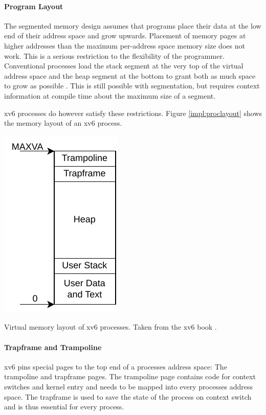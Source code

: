 \paragraph{Program Layout} The segmented memory design assumes that programs place their data at the low end of their address
space and grow upwards.
Placement of memory pages at higher addresses than the maximum per-address space memory size does not work. This is a serious restriction to the flexibility of the programmer. Conventional processes load the stack segment at the very top of the virtual address space and the heap segment at the bottom to grant both as much space to grow as possible \cite{tanenbaumOS}. This is still possible with segmentation, but requires context information at compile time about the maximum size of a segment.

xv6 processes do however satisfy these restrictions. Figure \ref{impl:proclayout} shows the memory layout
of an xv6 process.

\begin{marginfigure}
    \centering
    \includegraphics[scale=.8]{figures/prog_vm.pdf}
    \caption[xv6 memory layout]{Virtual memory layout of xv6 processes. Taken from the xv6 book \cite{cox2011xv6}.}
    \label{impl:proclayout}
\end{marginfigure}


\paragraph{Trapframe and Trampoline} xv6 pins special pages to the top end of a processes address space: The trampoline and trapframe pages.
The trampoline page contains code for context switches and kernel entry and needs to be mapped
into every processes address space.
The trapframe is used to save the state of the process on context switch and is thus essential for every process.

